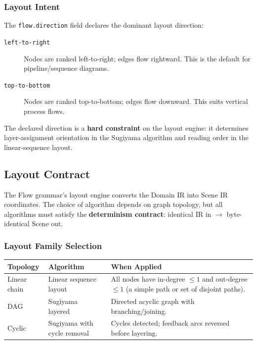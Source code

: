 \subsubsection{Layout Intent}
\label{sec:flow-layout-intent}

The \texttt{flow.direction} field declares the dominant layout direction:

\begin{description}
  \item[\texttt{left-to-right}] Nodes are ranked left-to-right; edges flow rightward. This is the default for pipeline/sequence diagrams.
  \item[\texttt{top-to-bottom}] Nodes are ranked top-to-bottom; edges flow downward. This suits vertical process flows.
\end{description}

The declared direction is a \textbf{hard constraint} on the layout engine: it determines layer-assignment orientation in the Sugiyama algorithm and reading order in the linear-sequence layout.

\subsection{Layout Contract}
\label{sec:flow-layout-contract}

The Flow grammar's layout engine converts the Domain IR into Scene IR coordinates. The choice of algorithm depends on graph topology, but all algorithms must satisfy the \textbf{determinism contract}: identical IR in $\rightarrow$ byte-identical Scene out.

\subsubsection{Layout Family Selection}

\begin{center}
\small
\begin{tabular}{lp{4.5cm}p{5.5cm}}
\toprule
\textbf{Topology} & \textbf{Algorithm} & \textbf{When Applied} \\
\midrule
Linear chain & Linear sequence layout & All nodes have in-degree $\le 1$ and out-degree $\le 1$ (a simple path or set of disjoint paths). \\
DAG & Sugiyama layered~\cite{sugiyama1981} & Directed acyclic graph with branching/joining. \\
Cyclic & Sugiyama with cycle removal & Cycles detected; feedback arcs reversed before layering. \\
\bottomrule
\end{tabular}
\end{center}

